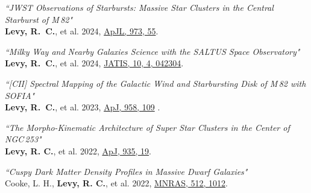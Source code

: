 \documentclass[11pt]{article}
\begin{document}
\begin{etaremune}[itemsep=-18pt]


\item \textit{``JWST Observations of Starbursts: Massive Star Clusters in the Central Starburst of M\,82"}\\
{\bf Levy, R.~C.}, et al. 2024, \href{https://ui.adsabs.harvard.edu/abs/2024arXiv240804135L/abstract}{ApJL, 973, 55}. \smallskip\\ 

\item \textit{``Milky Way and Nearby Galaxies Science with the SALTUS Space Observatory"}\\
{\bf Levy, R.~C.}, et al. 2024, \href{https://ui.adsabs.harvard.edu/abs/2024arXiv240416984L/abstract}{JATIS, 10, 4, 042304}.\smallskip\\

\item \textit{``[CII] Spectral Mapping of the Galactic Wind and Starbursting Disk of M\,82 with SOFIA"}\\
{\bf Levy, R.~C.}, et al. 2023, \href{https://ui.adsabs.harvard.edu/abs/2023ApJ...958..109L/abstract}{ApJ, 958, 109} .\smallskip\\ 

\item \textit{``The Morpho-Kinematic Architecture of Super Star Clusters in the Center of NGC\,253"}\\
{\bf Levy, R. C.}, et al. 2022, \href{https://ui.adsabs.harvard.edu/abs/2022ApJ...935...19L/abstract}{ApJ, 935, 19}. \smallskip\\

\item \textit{``Cuspy Dark Matter Density Profiles in Massive Dwarf Galaxies"}\\
Cooke, L. H., {\bf Levy, R. C.}, et al. 2022, \href{https://ui.adsabs.harvard.edu/abs/2022MNRAS.512.1012C/abstract}{MNRAS, 512, 1012}.\smallskip\\


\end{etaremune}
\end{document}
